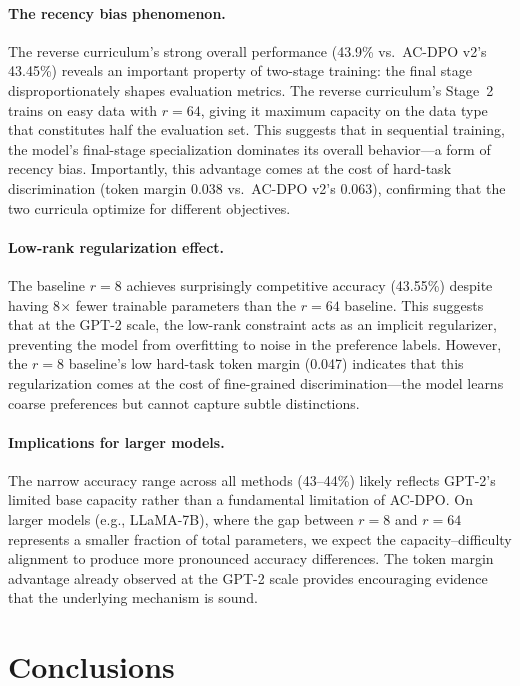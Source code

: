 \documentclass{article}
\begin{document}
\paragraph{The recency bias phenomenon.}
The reverse curriculum's strong overall performance (43.9\% vs.\ AC-DPO v2's 43.45\%) reveals an important property of two-stage training: the final stage disproportionately shapes evaluation metrics. The reverse curriculum's Stage~2 trains on easy data with $r{=}64$, giving it maximum capacity on the data type that constitutes half the evaluation set. This suggests that in sequential training, the model's final-stage specialization dominates its overall behavior---a form of recency bias. Importantly, this advantage comes at the cost of hard-task discrimination (token margin 0.038 vs.\ AC-DPO v2's 0.063), confirming that the two curricula optimize for different objectives.

\paragraph{Low-rank regularization effect.}
The baseline $r{=}8$ achieves surprisingly competitive accuracy (43.55\%) despite having 8$\times$ fewer trainable parameters than the $r{=}64$ baseline. This suggests that at the GPT-2 scale, the low-rank constraint acts as an implicit regularizer, preventing the model from overfitting to noise in the preference labels. However, the $r{=}8$ baseline's low hard-task token margin (0.047) indicates that this regularization comes at the cost of fine-grained discrimination---the model learns coarse preferences but cannot capture subtle distinctions.

\paragraph{Implications for larger models.}
The narrow accuracy range across all methods (43--44\%) likely reflects GPT-2's limited base capacity rather than a fundamental limitation of AC-DPO. On larger models (e.g., LLaMA-7B), where the gap between $r{=}8$ and $r{=}64$ represents a smaller fraction of total parameters, we expect the capacity--difficulty alignment to produce more pronounced accuracy differences. The token margin advantage already observed at the GPT-2 scale provides encouraging evidence that the underlying mechanism is sound.



\section{Conclusions}
\end{document}
